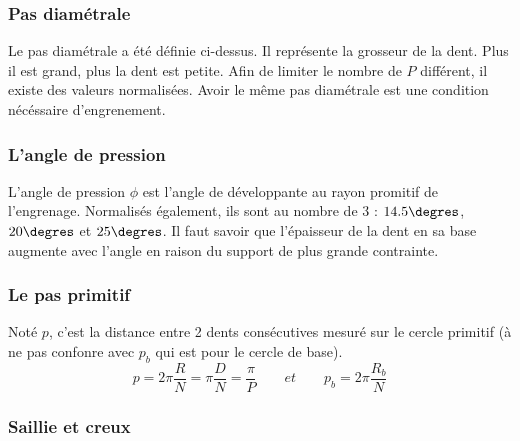 	\subsubsection{Pas diamétrale}
		Le pas diamétrale a été définie ci-dessus. Il représente la grosseur de la dent. Plus il est grand, plus la dent est petite. Afin de limiter le nombre de $P$ différent, il existe des valeurs normalisées. Avoir le même pas diamétrale est une condition nécéssaire d'engrenement. 
		
	\subsubsection{L'angle de pression}		
		L'angle de pression $\phi$ est l'angle de développante au rayon promitif de l'engrenage. Normalisés également, ils sont au nombre de 3 : $14.5\degres$, $20\degres$ et $25\degres$. Il faut savoir que l'épaisseur de la dent en sa base augmente avec l'angle en raison du support de plus grande contrainte. 
		
	\subsubsection{Le pas primitif}
		Noté $p$, c'est la distance entre 2 dents consécutives mesuré sur le cercle primitif (à ne pas confonre avec $p_b$ qui est pour le cercle de base). 
		\begin{equation}
			p = 2\pi \frac{R}{N} = \pi \frac{D}{N} = \frac{\pi}{P} \qquad et \qquad p_b = 2\pi \frac{R_b}{N}
		\end{equation}
		
	\subsubsection{Saillie et creux}
	